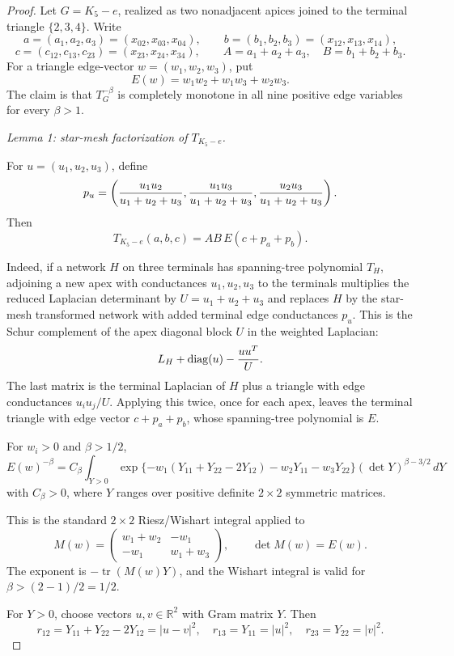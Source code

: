 \documentclass[11pt]{article}
\numberwithin{equation}{section}
\theoremstyle{definition}
\theoremstyle{remark}
\newcommand{\1}{\mathbf 1}
\begin{document}
\begin{proof}
Let \(G=K_5-e\), realized as two nonadjacent apices joined to the terminal triangle \(\{2,3,4\}\). Write
\[
a=(a_1,a_2,a_3)=(x_{02},x_{03},x_{04}),\qquad
b=(b_1,b_2,b_3)=(x_{12},x_{13},x_{14}),
\]
\[
c=(c_{12},c_{13},c_{23})=(x_{23},x_{24},x_{34}),
\qquad A=a_1+a_2+a_3,\quad B=b_1+b_2+b_3 .
\]
For a triangle edge-vector \(w=(w_1,w_2,w_3)\), put
\[
E(w)=w_1w_2+w_1w_3+w_2w_3 .
\]
The claim is that \(T_G^{-\beta}\) is completely monotone in all nine positive edge variables for every \(\beta>1\).

\emph{Lemma 1: star-mesh factorization of \(T_{K_5-e}\).}

For \(u=(u_1,u_2,u_3)\), define
\[
p_u=\left({u_1u_2\over u_1+u_2+u_3},
          {u_1u_3\over u_1+u_2+u_3},
          {u_2u_3\over u_1+u_2+u_3}\right).
\]
Then
\[
T_{K_5-e}(a,b,c)=AB\,E(c+p_a+p_b).
\]

Indeed, if a network \(H\) on three terminals has spanning-tree polynomial \(T_H\), adjoining a new apex with conductances \(u_1,u_2,u_3\) to the terminals multiplies the reduced Laplacian determinant by \(U=u_1+u_2+u_3\) and replaces \(H\) by the star-mesh transformed network with added terminal edge conductances \(p_u\). This is the Schur complement of the apex diagonal block \(U\) in the weighted Laplacian:
\[
L_H+\operatorname{diag}(u)-{uu^T\over U}.
\]
The last matrix is the terminal Laplacian of \(H\) plus a triangle with edge conductances \(u_iu_j/U\). Applying this twice, once for each apex, leaves the terminal triangle with edge vector \(c+p_a+p_b\), whose spanning-tree polynomial is \(E\).

For \(w_i>0\) and \(\beta>1/2\),
\[
E(w)^{-\beta}
=C_\beta\int_{Y>0}
\exp\{-w_1(Y_{11}+Y_{22}-2Y_{12})-w_2Y_{11}-w_3Y_{22}\}
(\det Y)^{\beta-3/2}\,dY
\]
with \(C_\beta>0\), where \(Y\) ranges over positive definite \(2\times2\) symmetric matrices.

This is the standard \(2\times2\) Riesz/Wishart integral applied to
\[
M(w)=
\begin{pmatrix}
w_1+w_2 & -w_1\\
-w_1 & w_1+w_3
\end{pmatrix},
\qquad \det M(w)=E(w).
\]
The exponent is \(-\operatorname{tr}(M(w)Y)\), and the Wishart integral is valid for \(\beta>(2-1)/2=1/2\).

For \(Y>0\), choose vectors \(u,v\in\mathbb R^2\) with Gram matrix \(Y\). Then
\[
r_{12}=Y_{11}+Y_{22}-2Y_{12}=|u-v|^2,\quad
r_{13}=Y_{11}=|u|^2,\quad
r_{23}=Y_{22}=|v|^2 .
\]


\end{proof}
\end{document}
